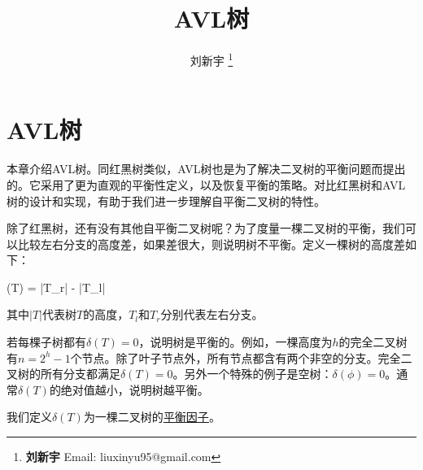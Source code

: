 \documentclass[UTF8]{article}
\begin{document}


\title{AVL树}

\author{刘新宇
\thanks{{\bfseries 刘新宇} \newline
  Email: liuxinyu95@gmail.com \newline}
  }

\maketitle
\fi


\ifx\wholebook\relax
\chapter{AVL树}
\fi


\label{introduction} 

本章介绍AVL树。同红黑树类似，AVL树也是为了解决二叉树的平衡问题而提出的。它采用了更为直观的平衡性定义，以及恢复平衡的策略。对比红黑树和AVL树的设计和实现，有助于我们进一步理解自平衡二叉树的特性。


除了红黑树，还有没有其他自平衡二叉树呢？为了度量一棵二叉树的平衡，我们可以比较左右分支的高度差，如果差很大，则说明树不平衡。定义一棵树的高度差如下：

\be
  \delta(T) = |T_r| - |T_l|
\ee

其中$|T|$代表树$T$的高度，$T_l$和$T_r$分别代表左右分支。

若每棵子树都有$\delta(T) = 0$，说明树是平衡的。例如，一棵高度为$h$的完全二叉树有$n = 2^h-1$个节点。除了叶子节点外，所有节点都含有两个非空的分支。完全二叉树的所有分支都满足$\delta(T)=0$。另外一个特殊的例子是空树：$\delta(\phi) = 0$。通常$\delta(T)$的绝对值越小，说明树越平衡。

我们定义$\delta(T)$为一棵二叉树的\underline{平衡因子}。
\end{document}
